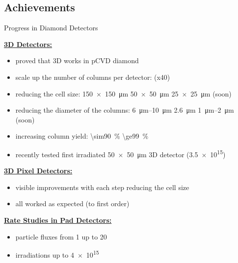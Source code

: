\subsection{Achievements}
\begin{frame}{Progress in Diamond Detectors}

	\textbf{\underline{3D Detectors:}}\vspace*{5pt}
	\begin{itemize}\itemfill
		\item proved that 3D works in pCVD diamond
		\item scale up the number of columns per detector:  \ra {} (x40)
		\item reducing the cell size: \SI{150x150}{\micro\meter} \ra \SI{50x50}{\micro\meter} \ra \SI{25x25}{\micro\meter} (soon)
		\item reducing the diameter of the columns: \SIrange{6}{10}{\micro\meter} \ra \SI{2.6}{\micro\meter} \ra \SIrange{1}{2}{\micro\meter} (soon)
		\item \ra increasing column yield: \SI{\sim90}{\%} \ra \SI{\ge99}{\%}
		\item recently tested first irradiated \SI{50x50}{\micro\meter} 3D detector (\SI{3.5e15}{\ncm})
	\end{itemize}
	
	\vspace*{5pt}\textbf{\underline{3D Pixel Detectors:}}\vspace*{5pt}
	\begin{itemize}\itemfill
		\item visible improvements with each step reducing the cell size
		\item all worked as expected (to first order)
	\end{itemize}
	
	\vspace*{5pt}\textbf{\underline{Rate Studies in Pad Detectors:}}\vspace*{5pt}
	\begin{itemize}\itemfill
		\item particle fluxes from \SI{1}{\khzcm} up to \SI{20}{\mhzcm}
		\item irradiations up to \SI{4e15}{\ncm}
	\end{itemize}


\end{frame}
